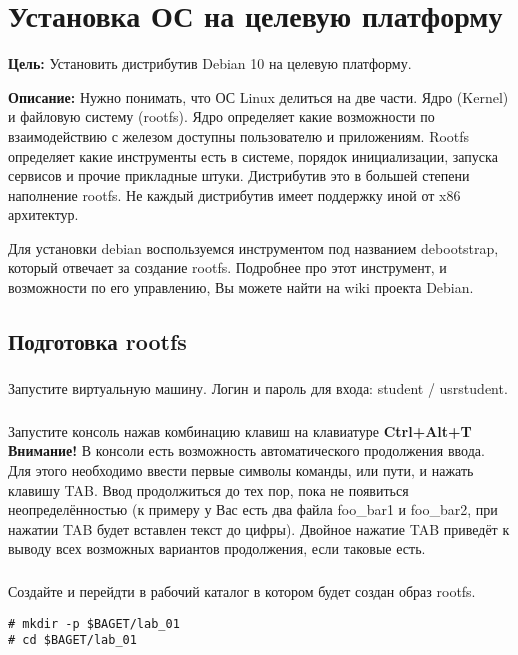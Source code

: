 \chapter{Установка ОС на целевую платформу}
\textbf{Цель:} Установить дистрибутив Debian 10 на целевую платформу.

\textbf{Описание:} Нужно понимать, что ОС Linux делиться на две части. Ядро (Kernel) и файловую систему (rootfs). Ядро определяет какие возможности по взаимодействию с железом доступны пользователю и приложениям. Rootfs определяет какие инструменты есть в системе, порядок инициализации, запуска сервисов и прочие прикладные штуки. Дистрибутив это в большей степени наполнение rootfs. Не каждый дистрибутив имеет поддержку иной от x86 архитектур.

Для установки debian воспользуемся инструментом под названием debootstrap, который отвечает за создание rootfs. Подробнее про этот инструмент, и возможности по его управлению, Вы можете найти на wiki проекта Debian.


\section{Подготовка rootfs}

\subsection{}Запустите виртуальную машину. Логин и пароль для входа: student / usrstudent.

\subsection{} Запустите консоль нажав комбинацию клавиш на клавиатуре \textbf{Ctrl+Alt+T} \\

\textbf{Внимание!} В консоли есть возможность автоматического продолжения ввода. Для этого необходимо ввести первые символы команды, или пути, и нажать клавишу TAB. Ввод продолжиться до тех пор, пока не появиться неопределённостью (к примеру у Вас есть два файла foo\_bar1 и foo\_bar2, при нажатии TAB будет вставлен текст до цифры). Двойное нажатие TAB приведёт к выводу всех возможных вариантов продолжения, если таковые есть.

\subsection{}Создайте и перейдти в рабочий каталог в котором будет создан образ rootfs.
\begin{lstlisting}[style=bash]
# mkdir -p $BAGET/lab_01
# cd $BAGET/lab_01 
\end{lstlisting}

